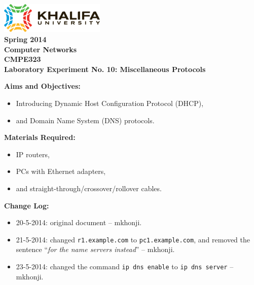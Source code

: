 \documentclass[pdftex,12pt,a4paper]{article}
\begin{document}
    \begin{titlepage}
        \begin{center}
            \includegraphics[width=5cm]{figures/kulogo}\\[1cm]
            {\Large \bfseries
                Spring 2014\\
                Computer Networks\\
                CMPE323\\[1cm]
            }
            {\large \bfseries
                \noindent Laboratory Experiment No. 10: Miscellaneous
                Protocols\\[1cm]
            }
        \end{center}

        \noindent \textbf{Aims and Objectives:}
            \begin{itemize}[leftmargin=4cm]
                \item Introducing Dynamic Host Configuration Protocol (DHCP),
                \item and Domain Name System (DNS) protocols.
            \end{itemize}
            \vspace{0.5cm}

        \noindent \textbf{Materials Required:}
            \begin{itemize}[leftmargin=4cm]
                \item IP routers,
                \item PCs with Ethernet adapters,
                \item and straight-through/crossover/rollover cables.
            \end{itemize}
            \vspace{0.5cm}

        \noindent \textbf{Change Log:}
            \begin{itemize}[leftmargin=4cm]
                \item 20-5-2014: original document -- mkhonji.
                \item 21-5-2014: changed \texttt{r1.example.com} to
                    \texttt{pc1.example.com}, and removed the sentence
                    ``\emph{for the name servers instead}'' -- mkhonji.
                \item 23-5-2014: changed the command \texttt{ip dns enable} to
                    \texttt{ip dns server} -- mkhonji.
            \end{itemize}
    \end{titlepage}
    \newpage
\end{document}
